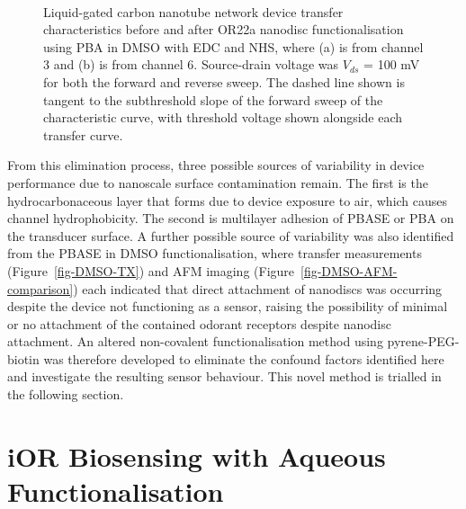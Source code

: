 \documentclass[
  a4paper,
]{scrbook}
\begin{document}
\begin{figure}
\begin{minipage}[t]{0.45\linewidth}
{{}

}

\end{minipage}%
%
\begin{minipage}[t]{0.01\linewidth}

{\centering 

~

}

\end{minipage}%

\caption[Liquid-gated carbon nanotube network device transfer
characteristics before and after OR22a nanodisc functionalisation using
PBA in DMSO with EDC and NHS, with threshold voltage shown alongside
each transfer curve.]{\label{fig-EDCNHS-TX}Liquid-gated carbon nanotube
network device transfer characteristics before and after OR22a nanodisc
functionalisation using PBA in DMSO with EDC and NHS, where (a) is from
channel 3 and (b) is from channel 6. Source-drain voltage was \(V_{ds}\)
= 100 mV for both the forward and reverse sweep. The dashed line shown
is tangent to the subthreshold slope of the forward sweep of the
characteristic curve, with threshold voltage shown alongside each
transfer curve.}

\end{figure}

From this elimination process, three possible sources of variability in
device performance due to nanoscale surface contamination remain. The
first is the hydrocarbonaceous layer that forms due to device exposure
to air, which causes channel hydrophobicity. The second is multilayer
adhesion of PBASE or PBA on the transducer surface. A further possible
source of variability was also identified from the PBASE in DMSO
functionalisation, where transfer measurements
(Figure~\ref{fig-DMSO-TX}) and AFM imaging
(Figure~\ref{fig-DMSO-AFM-comparison}) each indicated that direct
attachment of nanodiscs was occurring despite the device not functioning
as a sensor, raising the possibility of minimal or no attachment of the
contained odorant receptors despite nanodisc attachment. An altered
non-covalent functionalisation method using pyrene-PEG-biotin was
therefore developed to eliminate the confound factors identified here
and investigate the resulting sensor behaviour. This novel method is
trialled in the following section.

\hypertarget{sec-aqueous-functionalisation-biosensing}{%
\section{iOR Biosensing with Aqueous
Functionalisation}\label{sec-aqueous-functionalisation-biosensing}}
\end{document}
